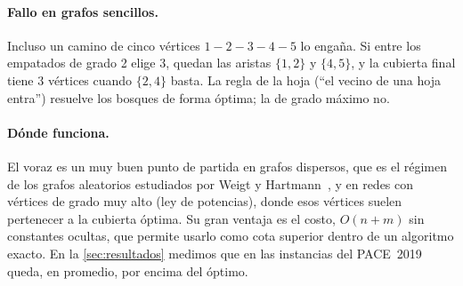 \paragraph{Fallo en grafos sencillos.} Incluso un camino de cinco vértices $1\!-\!2\!-\!3\!-\!4\!-\!5$ lo engaña. Si entre los empatados de grado 2 elige $3$, quedan las aristas $\{1,2\}$ y $\{4,5\}$, y la cubierta final tiene $3$ vértices cuando $\{2,4\}$ basta. La regla de la hoja (``el vecino de una hoja entra'') resuelve los bosques de forma óptima; la de grado máximo no.

\paragraph{Dónde funciona.} El voraz es un muy buen punto de partida en grafos dispersos, que es el régimen de los grafos aleatorios estudiados por Weigt y Hartmann~\citep{weigt2000}, y en redes con vértices de grado muy alto (ley de potencias), donde esos vértices suelen pertenecer a la cubierta óptima. Su gran ventaja es el costo, $O(n+m)$ sin constantes ocultas, que permite usarlo como cota superior dentro de un algoritmo exacto. En la \cref{sec:resultados} medimos que en las instancias del PACE~2019 queda, en promedio,  por encima del óptimo.
